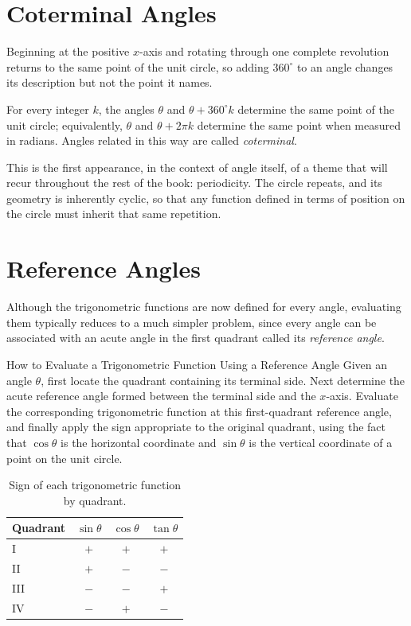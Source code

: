 \section{Coterminal Angles}

Beginning at the positive $x$-axis and rotating through one complete
revolution returns to the same point of the unit circle, so adding
$360^\circ$ to an angle changes its description but not the point it names.

\begin{theorem}
For every integer $k$, the angles $\theta$ and $\theta + 360^\circ k$
determine the same point of the unit circle; equivalently, $\theta$ and
$\theta + 2\pi k$ determine the same point when measured in radians. Angles
related in this way are called \emph{coterminal}.
\end{theorem}

This is the first appearance, in the context of angle itself, of a theme
that will recur throughout the rest of the book: periodicity. The circle
repeats, and its geometry is inherently cyclic, so that any function defined
in terms of position on the circle must inherit that same repetition.

\section{Reference Angles}

Although the trigonometric functions are now defined for every angle,
evaluating them typically reduces to a much simpler problem, since every
angle can be associated with an acute angle in the first quadrant called its
\emph{reference angle}.

\begin{algorithmproc}{How to Evaluate a Trigonometric Function Using a Reference Angle}
Given an angle $\theta$, first locate the quadrant containing its terminal
side. Next determine the acute reference angle formed between the terminal
side and the $x$-axis. Evaluate the corresponding trigonometric function at
this first-quadrant reference angle, and finally apply the sign appropriate
to the original quadrant, using the fact that $\cos\theta$ is the horizontal
coordinate and $\sin\theta$ is the vertical coordinate of a point on the
unit circle.
\end{algorithmproc}

\begin{table}[h]
\centering
\begin{tabular}{lccc}
\toprule
Quadrant & $\sin\theta$ & $\cos\theta$ & $\tan\theta$ \\
\midrule
I   & $+$ & $+$ & $+$ \\
II  & $+$ & $-$ & $-$ \\
III & $-$ & $-$ & $+$ \\
IV  & $-$ & $+$ & $-$ \\
\bottomrule
\end{tabular}
\caption{Sign of each trigonometric function by quadrant.}
\end{table}

